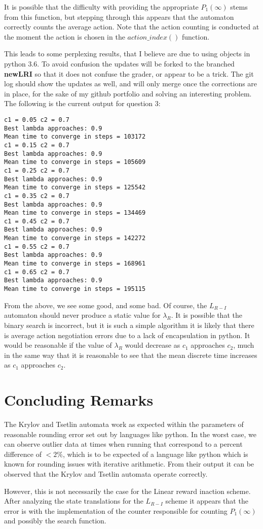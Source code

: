 \documentclass[10pt,english]{article}
\begin{document}
It is possible that the difficulty with providing the appropriate $P_1(\infty)$ stems from this function, but stepping through this appears that the automaton correctly counts the average action.  Note that the action counting is conducted at the moment the action is chosen in the $action\_index()$ function.

This leads to some perplexing results, that I believe are due to using objects in python 3.6.  To avoid confusion the updates will be forked to the branched \textbf{newLRI} so that it does not confuse the grader, or appear to be a trick.  The git log should show the updates as well, and will only merge once the corrections are in place, for the sake of my github portfolio and solving an interesting problem.  The following is the current output for question 3:
\begin{lstlisting}[label={list:first},caption=Testing the $L_{R-I}$  automaton.]
c1 = 0.05 c2 = 0.7
Best lambda approaches: 0.9
Mean time to converge in steps = 103172
c1 = 0.15 c2 = 0.7
Best lambda approaches: 0.9
Mean time to converge in steps = 105609
c1 = 0.25 c2 = 0.7
Best lambda approaches: 0.9
Mean time to converge in steps = 125542
c1 = 0.35 c2 = 0.7
Best lambda approaches: 0.9
Mean time to converge in steps = 134469
c1 = 0.45 c2 = 0.7
Best lambda approaches: 0.9
Mean time to converge in steps = 142272
c1 = 0.55 c2 = 0.7
Best lambda approaches: 0.9
Mean time to converge in steps = 168961
c1 = 0.65 c2 = 0.7
Best lambda approaches: 0.9
Mean time to converge in steps = 195115

\end{lstlisting}
From the above, we see some good, and some bad.  Of course, the $L_{R-I}$ automaton should never produce a static value for $\lambda_R$.  It is possible that the binary search is incorrect, but it is such a simple algorithm it is likely that there is average action negotiation errors due to a lack of encapsulation in python. It would be reasonable if the value of $\lambda_R$ would decrease as $c_1$ approaches $c_2$, much in the same way that it is reasonable to see that the mean discrete time increases as $c_1$ approaches $c_2$.
\clearpage
\section{Concluding Remarks}
    The Krylov and Tsetlin automata work as expected within the parameters of reasonable rounding error set out by languages like python.  In the worst case, we can observe outlier data at times when running that correspond to a percent difference of $< 2\%$, which is to be expected of a language like python which is known for rounding issues with iterative arithmetic.  From their output it can be observed that the Krylov and Tsetlin automata operate correctly.

    However, this is not necessarily the case for the Linear reward inaction scheme.  After analyzing the state translations for the $L_{R-I}$ scheme it appears that the error is with the implementation of the counter responsible for counting $P_1(\infty)$ and possibly the search function.
\end{document}
